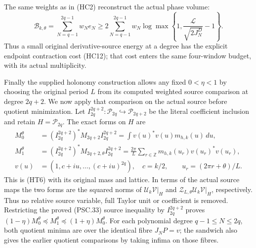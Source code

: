The same weights as in (HC2) reconstruct the actual phase volume:
\[
 \boxed{
 \mathcal B_{k,\theta}=\sum_{N=q-1}^{2q-1}w_N e_N
 \geq2\sum_{N=q-1}^{2q-1}w_N
 \log\max\left\{1,\frac{\mathcal L}{\sqrt{2J_N^D}}-1\right\}.}
 \tag{HC13}
\]
Thus a small original derivative-source energy at a degree has the
explicit endpoint contraction cost (HC12); that cost enters the same
four-window budget, with its actual multiplicity.

Finally the supplied holonomy construction allows any fixed
$0<\eta<1$ by choosing the original period $L$ from its computed
weighted source comparison at degree $2q+2$. We now apply that
comparison on the actual source before quotient minimization.
Let $I_{2q}^{2q+2}:\mathcal P_{2q}\hookrightarrow\mathcal P_{2q+2}$
be the literal coefficient inclusion and retain $H=\mathcal P_{2q}$.
The exact forms on $H$ are
\[
\begin{split}
 M_0^\theta&=(I_{2q}^{2q+2})^*M_{2q+2}I_{2q}^{2q+2}
       =\int v(u)^*v(u)m_{h,k}(u)\,du,\\
 M_1^\theta&=(I_{2q}^{2q+2})^*M_{2q+2,\theta}I_{2q}^{2q+2}
       =\frac{2\pi}{L}\sum_{r\in\mathbb Z}
          m_{h,k}(u_r)v(u_r)^*v(u_r),\\
 v(u)&=(1,c+iu,\ldots,(c+iu)^{2q}),\quad c=k/2,
       \qquad u_r=(2\pi r+\theta)/L.
\end{split}
\tag{HC14a}
\]
This is (HT6) with its original mass and lattice. In terms of the
actual source maps the two forms are the squared norms of
$\mathcal U_k\mathcal V|_H$ and
$\mathcal Z_{L,\theta}\mathcal U_k\mathcal V|_H$, respectively.
Thus no relative source variable, full Taylor unit or coefficient
is removed. Restricting the proved (PSC.33) source inequality by
$I_{2q}^{2q+2}$ proves
$(1-\eta)M_0^\theta\preceq M_1^\theta\preceq(1+\eta)M_0^\theta$.
For each polynomial degree $q-1\leq N\leq2q$, both quotient minima are over
the identical fibre $J_NP=v$; the sandwich also gives the earlier
quotient comparisons by taking infima on those fibres.

